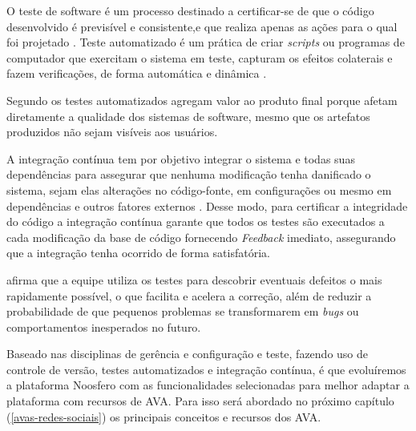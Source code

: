 O teste de software é um processo destinado a certificar-se de que o código desenvolvido é previsível e consistente,e que realiza apenas as ações para o qual foi projetado \cite{myers2011art}. Teste automatizado é um prática de criar \textit{scripts} ou programas de computador que exercitam o sistema em teste, capturam os efeitos colaterais e fazem verificações, de forma automática e dinâmica \cite{meszaros2007xunit}.

Segundo  os testes automatizados agregam valor ao produto final porque afetam diretamente a qualidade dos sistemas de software, mesmo que os artefatos produzidos não sejam visíveis aos usuários.

A integração contínua tem por objetivo integrar o sistema e todas suas dependências para assegurar que nenhuma modificação tenha danificado o sistema, sejam elas alterações no código-fonte, em configurações ou mesmo em dependências e outros fatores externos \cite{duvall2007continuous}. Desse modo, para certificar a integridade do código a integração contínua garante que todos os testes são executados a cada modificação da base de código fornecendo \textit{Feedback} imediato, assegurando que a integração tenha ocorrido de forma satisfatória.

 afirma que a equipe utiliza os testes para descobrir eventuais defeitos o mais rapidamente possível, o que facilita e acelera a correção, além de reduzir a probabilidade de que pequenos problemas se transformarem em \textit{bugs} ou comportamentos inesperados no futuro.

Baseado nas disciplinas de gerência e configuração e teste, fazendo uso de controle de versão, testes automatizados e integração contínua, é que evoluíremos a plataforma Noosfero com as funcionalidades selecionadas para melhor adaptar a plataforma com recursos de AVA. Para isso será abordado no próximo capítulo (\ref{avas-redes-sociais}) os principais conceitos e recursos dos AVA.